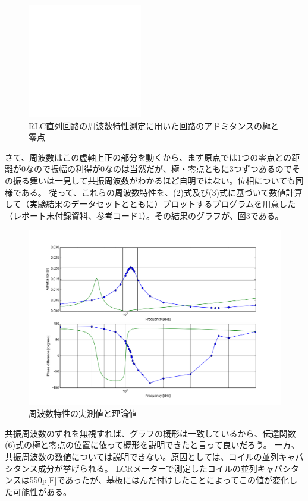 \documentclass[10pt,a4j,dvipdfmx]{jsarticle}
\begin{document}
\begin{figure}[H]
  \centering
  \includegraphics[width=5cm]{token.png}
  \caption{RLC直列回路の周波数特性測定に用いた回路のアドミタンスの極と零点}
\end{figure}

さて、周波数はこの虚軸上正の部分を動くから、まず原点では1つの零点との距離が0なので振幅の利得が0なのは当然だが、極・零点ともに3つずつあるのでその振る舞いは一見して共振周波数がわかるほど自明ではない。位相についても同様である。
従って、これらの周波数特性を、(2)式及び(3)式に基づいて数値計算して（実験結果のデータセットとともに）プロットするプログラムを用意した（レポート末付録資料、参考コード1）。その結果のグラフが、図3である。

\begin{figure}[H]
  \centering
  \includegraphics[width=16cm]{P1TF.png}
  \caption{周波数特性の実測値と理論値}
\end{figure}

共振周波数のずれを無視すれば、グラフの概形は一致しているから、伝達関数(6)式の極と零点の位置に依って概形を説明できたと言って良いだろう。
一方、共振周波数の数値については説明できない。原因としては、コイルの並列キャパシタンス成分が挙げられる。
LCRメーターで測定したコイルの並列キャパシタンスは550p[F]であったが、基板にはんだ付けしたことによってこの値が変化した可能性がある。
\end{document}

